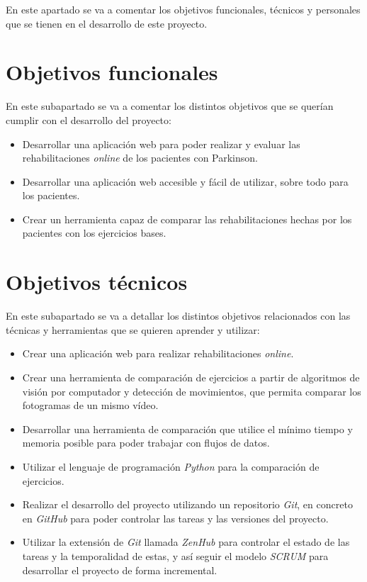 
En este apartado se va a comentar los objetivos funcionales, técnicos y personales que se tienen en el desarrollo de este proyecto.

\section{Objetivos funcionales}
En este subapartado se va a comentar los distintos objetivos que se querían cumplir con el desarrollo del proyecto:
\begin{itemize}
	\item Desarrollar una aplicación web para poder realizar y evaluar las rehabilitaciones \textit{online} de los pacientes con Parkinson.
	\item Desarrollar una aplicación web accesible y fácil de utilizar, sobre todo para los pacientes.
	\item Crear un herramienta capaz de comparar las rehabilitaciones hechas por los pacientes con los ejercicios bases.
\end{itemize}

\section{Objetivos técnicos}
En este subapartado se va a detallar los distintos objetivos relacionados con las técnicas y herramientas que se quieren aprender y utilizar:
\begin{itemize}
	\item Crear una aplicación web para realizar rehabilitaciones \textit{online}.
	\item Crear una herramienta de comparación de ejercicios a partir de algoritmos de visión por computador y detección de movimientos, que permita comparar los fotogramas de un mismo vídeo.
	\item Desarrollar una herramienta de comparación que utilice el mínimo tiempo y memoria posible para poder trabajar con flujos de datos.
	\item Utilizar el lenguaje de programación \textit{Python} para la comparación de ejercicios.
	\item Realizar el desarrollo del proyecto utilizando un repositorio \textit{Git}, en concreto en \textit{GitHub} para poder controlar las tareas y las versiones del proyecto.
	\item Utilizar la extensión de \textit{Git} llamada \textit{ZenHub} para controlar el estado de las tareas y la temporalidad de estas, y así seguir el modelo \textit{SCRUM} para desarrollar el proyecto de forma incremental.
\end{itemize}

